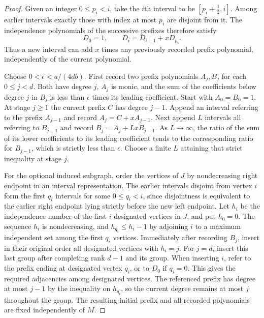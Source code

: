 \documentclass[11pt,a4paper]{article}
\begin{document}
\begin{proof}
Given an integer $0\le p_i<i$, take the $i$th interval to be
$[p_i+\tfrac12,i]$. Among earlier intervals exactly those with index
at most $p_i$ are disjoint from it. The independence polynomials of the
successive prefixes therefore satisfy
\[
 D_0=1,\qquad D_i=D_{i-1}+xD_{p_i}.
\]
Thus a new interval can add $x$ times any previously recorded prefix
polynomial, independently of the current polynomial.

Choose $0<\epsilon<a/(4db)$. First record two prefix polynomials
$A_j,B_j$ for each $0\le j<d$. Both have degree $j$, $A_j$ is monic,
and the sum of the coefficients below degree $j$ in $B_j$ is less
than $\epsilon$ times its leading coefficient. Start with $A_0=B_0=1$.
At stage $j\ge1$ the current prefix $C$ has degree $j-1$.
Append an interval referring to the prefix $A_{j-1}$ and record
$A_j=C+xA_{j-1}$. Next append $L$ intervals all referring to
$B_{j-1}$ and record $B_j=A_j+LxB_{j-1}$. As $L\to\infty$,
the ratio of the sum of its lower coefficients to its leading coefficient
tends to the corresponding ratio for $B_{j-1}$, which is strictly
less than $\epsilon$. Choose a finite $L$ attaining that strict
inequality at stage $j$.

For the optional induced subgraph, order the vertices of $J$ by
nondecreasing right endpoint in an interval representation.
The earlier intervals disjoint from vertex $i$ form the first $q_i$
intervals for some $0\le q_i<i$, since disjointness is equivalent to
the earlier right endpoint lying strictly before the new left endpoint.
Let $h_i$ be the independence number of the first $i$ designated
vertices in $J$, and put $h_0=0$. The sequence $h_i$ is nondecreasing,
and $h_{q_i}\le h_i-1$ by adjoining $i$ to a maximum independent
set among the first $q_i$ vertices. Immediately after recording $B_j$,
insert in their original order all designated vertices with $h_i=j$.
For $j=d$, insert this last group after completing rank $d-1$ and
its group. When inserting $i$, refer to the prefix ending at designated
vertex $q_i$, or to $D_0$ if $q_i=0$. This gives the required adjacencies
among designated vertices. The referenced prefix has degree at most
$j-1$ by the inequality on $h_{q_i}$, so the current degree remains
at most $j$ throughout the group. The resulting initial prefix and
all recorded polynomials are fixed independently of $M$.


\end{proof}
\end{document}
